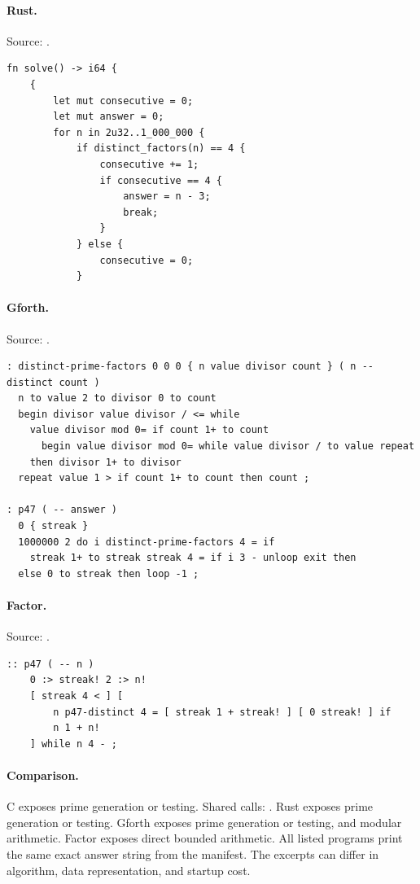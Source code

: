 \paragraph{Rust.} Source: .
\begin{lstlisting}
fn solve() -> i64 {
    {
        let mut consecutive = 0;
        let mut answer = 0;
        for n in 2u32..1_000_000 {
            if distinct_factors(n) == 4 {
                consecutive += 1;
                if consecutive == 4 {
                    answer = n - 3;
                    break;
                }
            } else {
                consecutive = 0;
            }
\end{lstlisting}

\paragraph{Gforth.} Source: .
\begin{lstlisting}
: distinct-prime-factors 0 0 0 { n value divisor count } ( n -- distinct count )
  n to value 2 to divisor 0 to count
  begin divisor value divisor / <= while
    value divisor mod 0= if count 1+ to count
      begin value divisor mod 0= while value divisor / to value repeat
    then divisor 1+ to divisor
  repeat value 1 > if count 1+ to count then count ;

: p47 ( -- answer )
  0 { streak }
  1000000 2 do i distinct-prime-factors 4 = if
    streak 1+ to streak streak 4 = if i 3 - unloop exit then
  else 0 to streak then loop -1 ;
\end{lstlisting}

\paragraph{Factor.} Source: .
\begin{lstlisting}
:: p47 ( -- n )
    0 :> streak! 2 :> n!
    [ streak 4 < ] [
        n p47-distinct 4 = [ streak 1 + streak! ] [ 0 streak! ] if
        n 1 + n!
    ] while n 4 - ;
\end{lstlisting}

\paragraph{Comparison.}
C exposes prime generation or testing. Shared calls: \texttt{}. Rust exposes prime generation or testing. Gforth exposes prime generation or testing, and modular arithmetic. Factor exposes direct bounded arithmetic.
All listed programs print the same exact answer string from the manifest. The excerpts can differ in algorithm, data representation, and startup cost.

